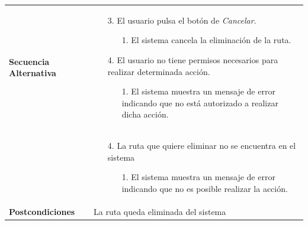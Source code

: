 \begin{longtable}{| p{4cm} | p{10cm} |}
\hline
\textbf{Secuencia Alternativa} &\mbox{}\par\vspace{-\baselineskip}
\begin{enumerate}[leftmargin=0.7cm, topsep=0.1cm]
\item[3.] El usuario pulsa el botón de \textit{Cancelar}.
	\begin{itemize}
	\item[1.] El sistema cancela la eliminación de la ruta.
	\end{itemize}
\item[4.] El usuario no tiene permisos necesarios para realizar determinada acción.
	\begin{itemize}
	\item[1.] El sistema muestra un mensaje de error indicando que no está autorizado a realizar dicha acción.
	\end{itemize}
\end{enumerate}
\\ &\mbox{}\par\vspace{-\baselineskip}
\begin{enumerate}[leftmargin=0.7cm, topsep=0.1cm]
\item[4.] La ruta que quiere eliminar no se encuentra en el sistema
	\begin{itemize}
	\item[1.] El sistema muestra un mensaje de error indicando que no es posible realizar la acción.
	\end{itemize}
\end{enumerate}

\\

\hline
\textbf{Postcondiciones} & 
La ruta queda eliminada del sistema\\
\hline
\end{longtable}


\newpage
